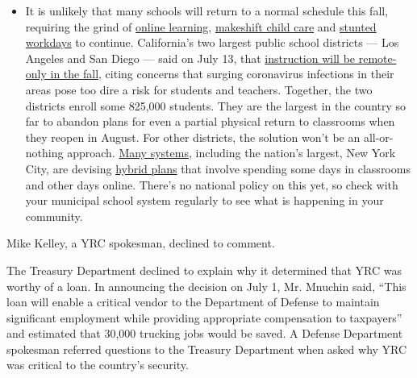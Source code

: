 \begin{itemize}
  \begin{itemize}
  \tightlist
  \item
    It is unlikely that many schools will return to a normal schedule
    this fall, requiring the grind of
    \href{https://www.nytimes3xbfgragh.onion/2020/06/05/us/coronavirus-education-lost-learning.html?action=click\&pgtype=Article\&state=default\&region=MAIN_CONTENT_3\&context=storylines_faq}{online
    learning},
    \href{https://www.nytimes3xbfgragh.onion/2020/05/29/us/coronavirus-child-care-centers.html?action=click\&pgtype=Article\&state=default\&region=MAIN_CONTENT_3\&context=storylines_faq}{makeshift
    child care} and
    \href{https://www.nytimes3xbfgragh.onion/2020/06/03/business/economy/coronavirus-working-women.html?action=click\&pgtype=Article\&state=default\&region=MAIN_CONTENT_3\&context=storylines_faq}{stunted
    workdays} to continue. California's two largest public school
    districts --- Los Angeles and San Diego --- said on July 13, that
    \href{https://www.nytimes3xbfgragh.onion/2020/07/13/us/lausd-san-diego-school-reopening.html?action=click\&pgtype=Article\&state=default\&region=MAIN_CONTENT_3\&context=storylines_faq}{instruction
    will be remote-only in the fall}, citing concerns that surging
    coronavirus infections in their areas pose too dire a risk for
    students and teachers. Together, the two districts enroll some
    825,000 students. They are the largest in the country so far to
    abandon plans for even a partial physical return to classrooms when
    they reopen in August. For other districts, the solution won't be an
    all-or-nothing approach.
    \href{https://bioethics.jhu.edu/research-and-outreach/projects/eschool-initiative/school-policy-tracker/}{Many
    systems}, including the nation's largest, New York City, are
    devising
    \href{https://www.nytimes3xbfgragh.onion/2020/06/26/us/coronavirus-schools-reopen-fall.html?action=click\&pgtype=Article\&state=default\&region=MAIN_CONTENT_3\&context=storylines_faq}{hybrid
    plans} that involve spending some days in classrooms and other days
    online. There's no national policy on this yet, so check with your
    municipal school system regularly to see what is happening in your
    community.
  \end{itemize}
\end{itemize}

Mike Kelley, a YRC spokesman, declined to comment.

The Treasury Department declined to explain why it determined that YRC
was worthy of a loan. In announcing the decision on July 1, Mr. Mnuchin
said, ``This loan will enable a critical vendor to the Department of
Defense to maintain significant employment while providing appropriate
compensation to taxpayers'' and estimated that 30,000 trucking jobs
would be saved. A Defense Department spokesman referred questions to the
Treasury Department when asked why YRC was critical to the country's
security.

